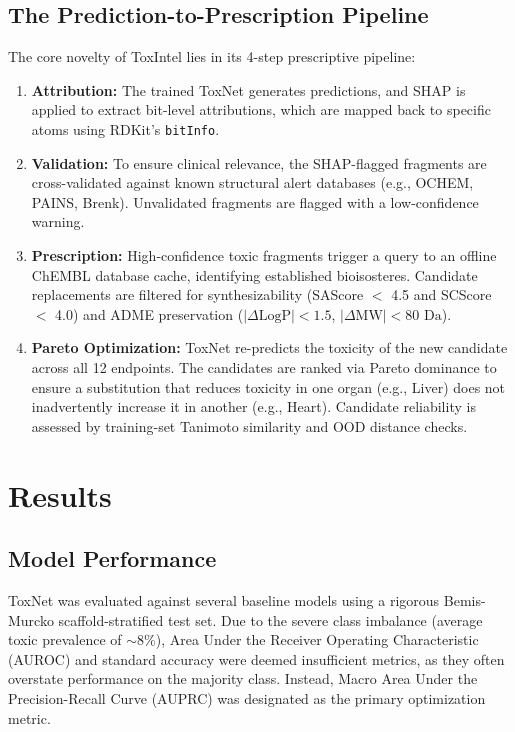 \documentclass[lettersize,journal]{IEEEtran}
\begin{document}
\subsection{The Prediction-to-Prescription Pipeline}
The core novelty of ToxIntel lies in its 4-step prescriptive pipeline:
\begin{enumerate}
\item \textbf{Attribution:} The trained ToxNet generates predictions, and SHAP \cite{ref4} is applied to extract bit-level attributions, which are mapped back to specific atoms using RDKit's \texttt{bitInfo}.
\item \textbf{Validation:} To ensure clinical relevance, the SHAP-flagged fragments are cross-validated against known structural alert databases (e.g., OCHEM, PAINS, Brenk). Unvalidated fragments are flagged with a low-confidence warning.
\item \textbf{Prescription:} High-confidence toxic fragments trigger a query to an offline ChEMBL database cache, identifying established bioisosteres. Candidate replacements are filtered for synthesizability (SAScore $<$ 4.5 and SCScore $<$ 4.0) and ADME preservation ($|\Delta\text{LogP}| < 1.5$, $|\Delta\text{MW}| < 80 \text{ Da}$).
\item \textbf{Pareto Optimization:} ToxNet re-predicts the toxicity of the new candidate across all 12 endpoints. The candidates are ranked via Pareto dominance to ensure a substitution that reduces toxicity in one organ (e.g., Liver) does not inadvertently increase it in another (e.g., Heart). Candidate reliability is assessed by training-set Tanimoto similarity and OOD distance checks.
\end{enumerate}

\section{Results}

\subsection{Model Performance}
ToxNet was evaluated against several baseline models using a rigorous Bemis-Murcko scaffold-stratified test set. Due to the severe class imbalance (average toxic prevalence of $\sim$8\%), Area Under the Receiver Operating Characteristic (AUROC) and standard accuracy were deemed insufficient metrics, as they often overstate performance on the majority class. Instead, Macro Area Under the Precision-Recall Curve (AUPRC) was designated as the primary optimization metric. 
\end{document}
